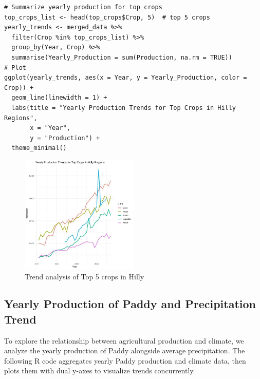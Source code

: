 \begin{verbatim}
# Summarize yearly production for top crops
top_crops_list <- head(top_crops$Crop, 5)  # top 5 crops
yearly_trends <- merged_data %>%
  filter(Crop %in% top_crops_list) %>%
  group_by(Year, Crop) %>%
  summarise(Yearly_Production = sum(Production, na.rm = TRUE))
# Plot
ggplot(yearly_trends, aes(x = Year, y = Yearly_Production, color = Crop)) +
  geom_line(linewidth = 1) +
  labs(title = "Yearly Production Trends for Top Crops in Hilly Regions",
       x = "Year",
       y = "Production") +
  theme_minimal()
\end{verbatim}

\begin{figure}[h]
\centering
\includegraphics[width=0.5\textwidth]{figures/top5_agri.jpg}
\caption{Trend analysis of Top 5 crops in Hilly}
\end{figure}

\subsection*{Yearly Production of Paddy and Precipitation Trend}

To explore the relationship between agricultural production and climate, we analyze the yearly production of Paddy alongside average precipitation. The following R code aggregates yearly Paddy production and climate data, then plots them with dual y-axes to visualize trends concurrently.


